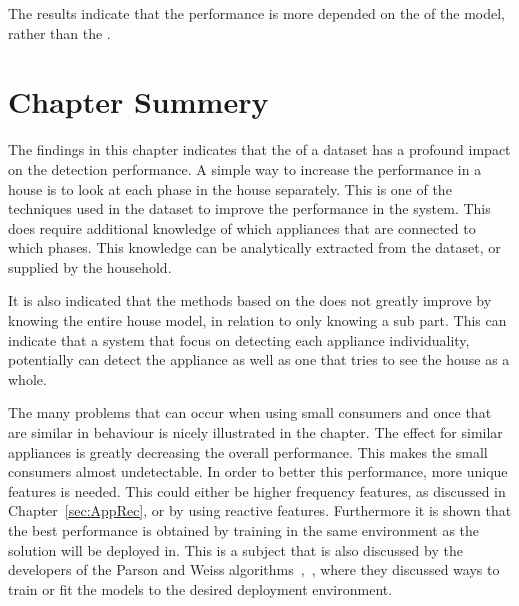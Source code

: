 The results indicate that the performance is more depended on the  of the model, rather than the .

\section{Chapter Summery}
The findings in this chapter indicates that the  of a dataset has a profound impact on the detection performance. A simple way to increase the performance in a house is to look at each phase in the house separately. This is one of the techniques used in the  dataset to improve the performance in the system. This does require additional knowledge of which appliances that are connected to which phases. This knowledge can be analytically extracted from the dataset, or supplied by the household. 

It is also indicated that the methods based on the  does not greatly improve by knowing the entire house model, in relation to only knowing a sub part. This can indicate that a system that focus on detecting each appliance individuality, potentially can detect the appliance as well as one that tries to see the house as a whole.   

The many problems that can occur when using small consumers and once that are similar in behaviour is nicely illustrated in the chapter. The  effect for similar appliances is greatly decreasing the overall performance. This makes the small consumers almost undetectable. In order to better this performance, more unique features is needed. This could either be higher frequency features, as discussed in Chapter~\ref{sec:AppRec}, or by using reactive features. Furthermore it is shown that the best performance is obtained by training in the same environment as the solution will be deployed in. This is a subject that is also discussed by the developers of the Parson and Weiss algorithms~\citep{RefWorks:28},~\citep{RefWorks:23}, where they discussed ways to train or fit the models to the desired deployment environment.